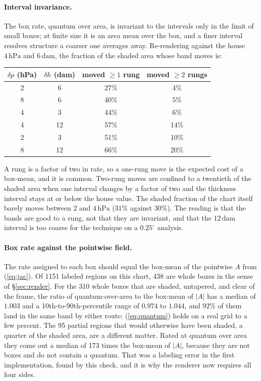 \documentclass[11pt]{article}
\newcommand{\hPa}{\ensuremath{\,\mathrm{hPa}}}
\newcommand{\dam}{\ensuremath{\,\mathrm{dam}}}
\begin{document}
\paragraph{Interval invariance.} The box rate, quantum over area, is invariant to the intervals only in the limit of small boxes; at finite size it is an area mean over the box, and a finer interval resolves structure a coarser one averages away. Re-rendering against the house $4\hPa$ and $6\dam$, the fraction of the shaded area whose band moves is:

\begin{center}
\begin{tabular}{@{}cccc@{}}
\toprule
$\delta p$ (hPa) & $\delta h$ (dam) & moved $\ge 1$ rung & moved $\ge 2$ rungs \\
\midrule
2 & 6 & 27\% & 4\% \\
8 & 6 & 40\% & 5\% \\
4 & 3 & 44\% & 6\% \\
4 & 12 & 57\% & 14\% \\
2 & 3 & 51\% & 10\% \\
8 & 12 & 66\% & 20\% \\
\bottomrule
\end{tabular}
\end{center}

\noindent A rung is a factor of two in rate, so a one-rung move is the expected cost of a box-mean, and it is common. Two-rung moves are confined to a twentieth of the shaded area when one interval changes by a factor of two and the thickness interval stays at or below the house value. The shaded fraction of the chart itself barely moves between $2$ and $4\hPa$ ($31\%$ against $30\%$). The reading is that the bands are good to a rung, not that they are invariant, and that the $12\dam$ interval is too coarse for the technique on a $0.25^\circ$ analysis.

\paragraph{Box rate against the pointwise field.} The rate assigned to each box should equal the box-mean of the pointwise $A$ from (\ref{eq:jac}). Of 1151 labeled regions on this chart, 438 are whole boxes in the sense of \S\ref{sec:render}. For the 310 whole boxes that are shaded, untapered, and clear of the frame, the ratio of quantum-over-area to the box-mean of $|A|$ has a median of $1.003$ and a 10th-to-90th-percentile range of $0.974$ to $1.044$, and $92\%$ of them land in the same band by either route: (\ref{eq:quantum}) holds on a real grid to a few percent. The 95 partial regions that would otherwise have been shaded, a quarter of the shaded area, are a different matter. Rated at quantum over area they come out a median of 173 times the box-mean of $|A|$, because they are not boxes and do not contain a quantum. That was a labeling error in the first implementation, found by this check, and it is why the renderer now requires all four sides.
\end{document}
